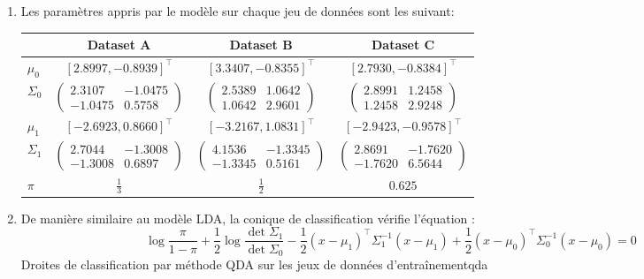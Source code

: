 \documentclass{article}
\begin{document}
\begin{enumerate}[label=(\alph*)]
\item Les paramètres appris par le modèle sur chaque jeu de données sont les suivant:
\begin{center}
\begin{tabular}{|l|c|c|c|}
\hline
    & Dataset A & Dataset B & Dataset C\\
\hline
$\mu_0$ & $[2.8997, -0.8939]^\intercal$ & $[3.3407, -0.8355]^\intercal$& $[2.7930, -0.8384]^\intercal$\\
\hline
$\Sigma_0$ & $\begin{pmatrix}2.3107&-1.0475\\-1.0475&0.5758\end{pmatrix}$ & $\begin{pmatrix}2.5389&1.0642\\1.0642&2.9601\end{pmatrix}$ & $\begin{pmatrix}2.8991&1.2458\\1.2458&2.9248\end{pmatrix}$\\
\hline
$\mu_1$ & $[-2.6923,  0.8660]^\intercal$ & $[-3.2167, 1.0831]^\intercal$& $[-2.9423, -0.9578]^\intercal$\\
\hline
$\Sigma_1$ & $\begin{pmatrix}2.7044&-1.3008\\-1.3008&0.6897\end{pmatrix}$ & $\begin{pmatrix}4.1536&-1.3345\\-1.3345&0.5161\end{pmatrix}$ & $\begin{pmatrix}2.8691&-1.7620\\-1.7620&6.5644\end{pmatrix}$\\
\hline
$\pi$ & $\frac{1}{3}$ & $\frac{1}{2}$ & $0.625$\\
\hline
\end{tabular}
\end{center}

\item De manière similaire au modèle LDA, la conique de classification vérifie l'équation :
$$
\log \frac{\pi}{1 - \pi} + \frac{1}{2}\log\frac{\det \Sigma_1}{\det \Sigma_0} - \frac{1}{2}(x-\mu_1)^\intercal\Sigma_1^{-1}(x-\mu_1) + \frac{1}{2}(x-\mu_0)^\intercal\Sigma_0^{-1}(x-\mu_0) = 0
$$
          {}
          {}
          {Droites de classification par méthode QDA sur les jeux de données d'entraînement}{qda}


\end{enumerate}
\end{document}
